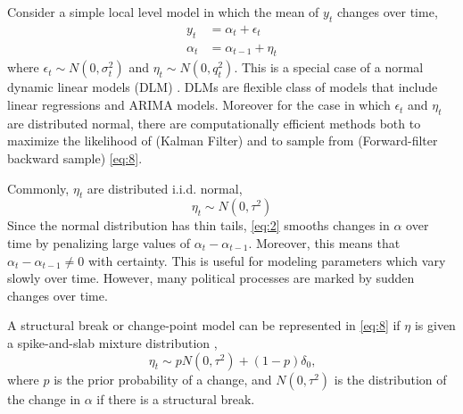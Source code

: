 \documentclass{article}
\begin{document}
Consider a simple local level model in which the mean of $y_{t}$ changes over time,
\begin{equation}
  \label{eq:16}
  \begin{aligned}
    y_t &= \alpha_t + \epsilon_t \\
    \alpha_t &= \alpha_{t-1} + \eta_{t}
  \end{aligned}
\end{equation}
where $\epsilon_{t} \sim N(0, \sigma_{t}^{2})$ and $\eta_{t} \sim N(0, q_{t}^{2})$.
This is a special case of a normal dynamic linear models (DLM) \parencites{WestHarrison1997}{DurbinKoopman2012}{CommandeurKoopman2007}{ShumwayStoffer2010}.
DLMs are flexible class of models that include linear regressions and ARIMA models.
Moreover for the case in which $\epsilon_{t}$ and $\eta_{t}$ are distributed normal, there are computationally efficient methods both to maximize the likelihood of (Kalman Filter) and to sample from (Forward-filter backward sample) \eqref{eq:8}.

Commonly, $\eta_{t}$ are distributed i.i.d. normal,
\begin{equation}
  \label{eq:2}
  \eta_{t} \sim N(0, \tau^{2})
\end{equation}
Since the normal distribution has thin tails, \eqref{eq:2} smooths changes in $\alpha$ over time by penalizing large values of $\alpha_{t} - \alpha_{t-1}$.
Moreover, this means that $\alpha_{t} - \alpha_{t-1} \neq 0$ with certainty.
This is useful for modeling parameters which vary slowly over time.
However, many political processes are marked by sudden changes over time.

A structural break or change-point model can be represented in \eqref{eq:8} if $\eta$ is given a spike-and-slab mixture distribution \parencite{GiordaniKohn2008},
\begin{equation}
  \label{eq:1}
  \eta_{t} \sim p N(0, \tau^{2}) + (1 - p) \delta_{0} \text{,}
\end{equation}
where $p$ is the prior probability of a change, and $N(0, \tau^{2})$ is the distribution of the change in $\alpha$ if there is a structural break.

\end{document}
